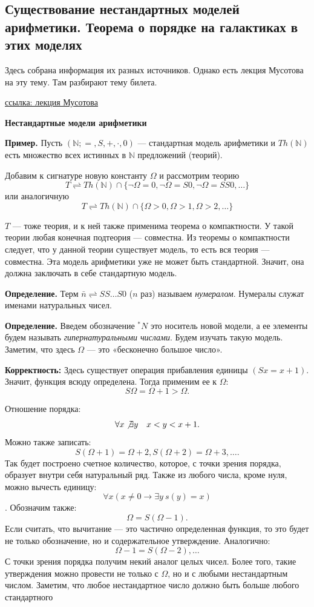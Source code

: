 \subsection{Существование нестандартных моделей арифметики. Теорема о порядке на галактиках в этих моделях}

Здесь собрана информация их разных источников. Однако есть лекция Мусотова на эту тему. Там разбирают тему билета.

\href{https://mipt.lectoriy.ru/lecture/Maths-MathemLogic-L15-Musatov-141210.01}{ссылка: лекция Мусотова}

\textbf{Нестандартные модели арифметики}

\textbf{Пример.} Пусть $(\mathbb{N}; =, S, +, \cdot, 0)$ — стандартная модель арифметики и $Th(\mathbb{N})$
есть множество всех истинных в $\mathbb{N}$ предложений (теорий).

Добавим к сигнатуре новую константу $\Omega$ и рассмотрим теорию
$$T \rightleftharpoons Th(\mathbb{N}) \cap \{\neg \Omega = 0, \neg \Omega = S0, \neg \Omega = SS0, \ldots \}$$
или аналогичную
$$T \rightleftharpoons Th(\mathbb{N}) \cap \{\Omega > 0, \Omega > 1, \Omega > 2, \ldots \}$$

$T$ — тоже теория, и к ней также применима теорема о компактности. У такой теории любая конечная подтеория — совместна. Из теоремы о компактности следует, что у данной теории существует модель, то есть вся теория — совместна. Эта модель арифметики уже не может быть стандартной.
Значит, она должна заключать в себе стандартную модель.

\textbf{Определение.} Терм $\bar n \rightleftharpoons SS \ldots S0$ ($n$ раз) называем \textit{нумералом}. Нумералы служат именами натуральных чисел.

\textbf{Определение.} Введем обозначение $^*N$ это носитель новой модели, а ее элементы будем называть \textit{гипернатуральными числами}. Будем изучать такую модель. Заметим, что здесь $\Omega$ — это
«бесконечно большое число».

\textbf{Корректность:}
Здесь существует операция прибавления единицы $(Sx = x + 1)$. Значит, функция всюду определена. Тогда применим ее к $\Omega$:
$$S \Omega = \Omega + 1 > \Omega.$$

Отношение порядка:
$$\forall x \not \exists y \ \ \ x < y < x + 1.$$
Можно также записать:
$$S(\Omega + 1) = \Omega + 2, S(\Omega + 2) = \Omega + 3, \ldots .$$
Так будет построено счетное количество, которое, с точки зрения порядка, образует внутри себя натуральный ряд. Также из любого числа, кроме нуля, можно вычесть единицу:
$$\forall x (x \neq 0 \rightarrow \exists y \ s(y) = x)$$.
Обозначим также:
$$\Omega = S(\Omega - 1).$$
Если считать, что вычитание — это частично определенная функция, то это будет не только обозначение, но и содержательное утверждение.
Аналогично:
$$\Omega - 1 = S(\Omega - 2), \ldots$$
С точки зрения порядка получим некий аналог целых чисел. Более того, такие утверждения можно провести не только с $\Omega$, но и с любыми нестандартным числом.
Заметим, что любое нестандартное число должно быть больше любого стандартного

